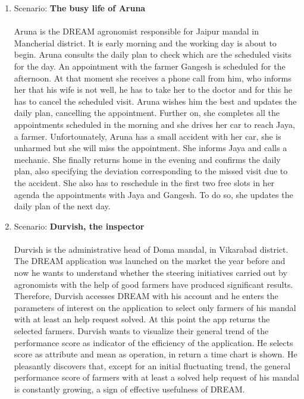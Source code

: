 \begin{enumerate}
\item Scenario: \textbf{The busy life of Aruna}\\\\
Aruna is the DREAM agronomist responsible for Jaipur mandal in Mancherial district. It is early morning and the working day is about to begin. Aruna consults the daily plan to check which are the scheduled visits for the day. An appointment with the farmer Gangesh is scheduled for the afternoon. At that moment she receives a phone call from him, who informs her that his wife is not well, he has to take her to the doctor and for this he has to cancel the scheduled visit. Aruna wishes him the best and updates the daily plan, cancelling the appointment. Further on, she completes all the appointments scheduled in the morning and she drives her car to reach Jaya, a farmer. Unfortounately, Aruna has a small accident with her car, she is unharmed but she will miss the appointment. She informs Jaya and calls a mechanic. She finally returns home in the evening and confirms the daily plan, also specifying the deviation corresponding to the missed visit due to the accident. She also has to reschedule in the first two free slots in her agenda the appointments with Jaya and Gangesh. To do so, she updates the daily plan of the next day. 
\\
\item Scenario: \textbf{Durvish, the inspector}\\\\
Durvish is the administrative head of Doma mandal, in Vikarabad district. The DREAM application was launched on the market the year before and now he wants to understand whether the steering initiatives carried out by agronomists with the help of good farmers have produced significant results. Therefore, Durvish accesses DREAM with his account and he enters the parameters of interest on the application to select only farmers of his mandal with at least an help request solved.
At this point the app returns the selected farmers. Durvish wants to visualize their general trend of the performance score as indicator of the efficiency of the application. He selects score as attribute and mean as operation, in return a time chart is shown. He pleasantly discovers that, except for an initial fluctuating trend, the general performance score of farmers with at least a solved help request of his mandal is constantly growing, a sign of effective usefulness of DREAM.
\\


\end{enumerate}
